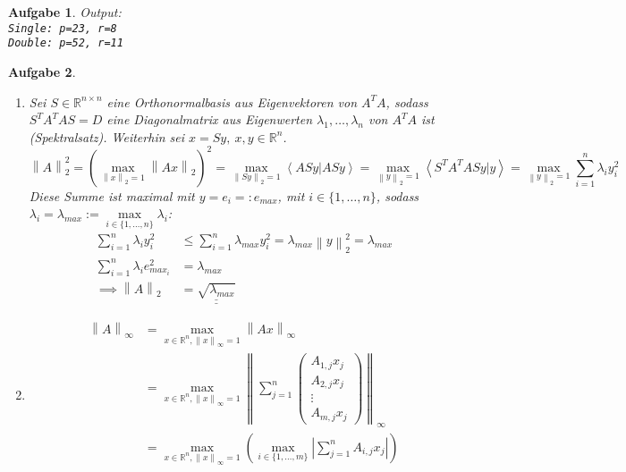\documentclass[11pt]{article}
\theoremstyle{break}
\newtheorem{task}{Aufgabe}
\newcommand{\set}[1]{\ensuremath{\{#1\}}}
\newcommand{\abs}[1]{\ensuremath{\left\vert #1 \right\vert}}
\newcommand{\norm}[1]{\ensuremath{\left\| #1 \right\|}}
\newcommand{\skal}[2]{\ensuremath{\left\langle #1 | #2 \right\rangle}}
\newcommand{\R}{\ensuremath{\mathbb{R}}}
\begin{document}
\newpage
\begin{task}
    \hfill\vspace{-5mm}
    
    Output:\\
    \texttt{Single: p=23, r=8\\
    Double: p=52, r=11}
    
\end{task}
\newpage
\begin{task}
    \hfill\vspace{-5mm}
    \begin{enumerate} [label={(\alph*)}]
        \item Sei $S\in \R^{n\times n}$ eine Orthonormalbasis aus Eigenvektoren von $A^TA$, sodass $S^TA^TAS=D$ eine Diagonalmatrix aus Eigenwerten $\lambda_1, \dots, \lambda_n$ von $A^TA$ ist (Spektralsatz). Weiterhin sei $x = Sy,\ x,y\in\R^n$.
        $$\norm{A}_2^2 = (\max\limits_{\norm{x}_2 = 1} \norm{Ax}_2)^2 = \max\limits_{\norm{Sy}_2 = 1} \skal{ASy}{ASy} = \max\limits_{\norm{y}_2 = 1} \skal{S^TA^TASy}{y} = \max\limits_{\norm{y}_2 = 1} \sum\limits_{i=1}^n \lambda_i y_i^2$$
        Diese Summe ist maximal mit $y=e_i=:e_{max}$, mit $i\in \set{1,\dots, n}$, sodass $\lambda_i = \lambda_{max} := \max\limits_{i\in\set{1,\dots,n}} \lambda_i$:
        \begin{align*}
            \sum\limits_{i=1}^n \lambda_i y_i^2&\leq \sum\limits_{i=1}^n \lambda_{max} y_i^2 = \lambda_{max} \norm{y}_2^2 = \lambda_{max}\\
            \sum\limits_{i=1}^n \lambda_i e_{max_i}^2 &= \lambda_{max}\\
            \implies \norm{A}_2 &= \underline{\underline{\sqrt{\lambda_{max}}}}
        \end{align*}
        \item \begin{align*}
            \norm{A}_\infty &= \max\limits_{x\in \R^n, \norm{x}_\infty = 1}\norm{Ax}_\infty\\
            &= \max\limits_{x\in \R^n, \norm{x}_\infty = 1}\norm{\sum\limits_{j=1}^n\left(
            \begin{matrix}
                A_{1,j}x_j\\
                A_{2,j}x_j\\
                \vdots\\
                A_{m,j}x_j
            \end{matrix}
            \right)}_\infty\\
            &= \max\limits_{x\in \R^n, \norm{x}_\infty = 1}\left(\max\limits_{i\in\set{1,\dots,m}}\abs{\sum\limits_{j=1}^n A_{i,j}x_j}\right)\\

\end{align*}
\end{enumerate}
\end{task}
\end{document}
